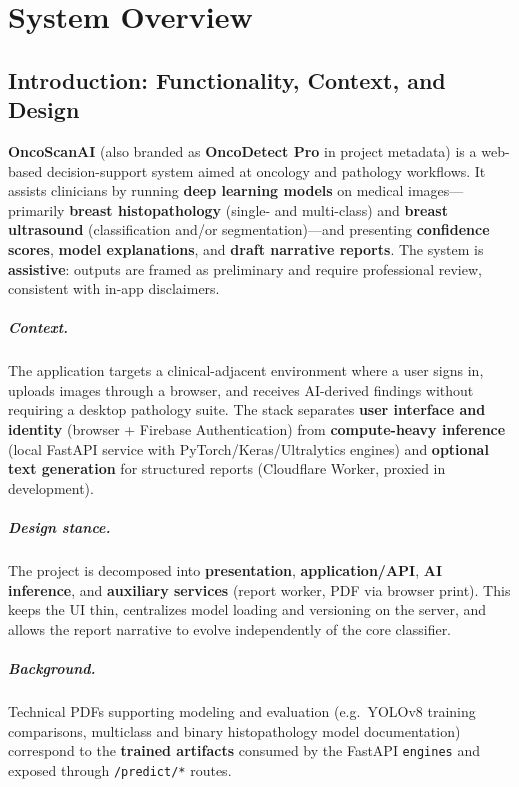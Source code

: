 \documentclass[12pt,a4paper]{report}
\begin{document}
\tableofcontents
\newpage

\chapter{System Overview}
\label{ch:system-overview}

\section{Introduction: Functionality, Context, and Design}

\textbf{OncoScanAI} (also branded as \textbf{OncoDetect Pro} in project metadata) is a web-based decision-support system aimed at oncology and pathology workflows. It assists clinicians by running \textbf{deep learning models} on medical images---primarily \textbf{breast histopathology} (single- and multi-class) and \textbf{breast ultrasound} (classification and/or segmentation)---and presenting \textbf{confidence scores}, \textbf{model explanations}, and \textbf{draft narrative reports}. The system is \textbf{assistive}: outputs are framed as preliminary and require professional review, consistent with in-app disclaimers.

\paragraph{Context.}
The application targets a clinical-adjacent environment where a user signs in, uploads images through a browser, and receives AI-derived findings without requiring a desktop pathology suite. The stack separates \textbf{user interface and identity} (browser + Firebase Authentication) from \textbf{compute-heavy inference} (local FastAPI service with PyTorch/Keras/Ultralytics engines) and \textbf{optional text generation} for structured reports (Cloudflare Worker, proxied in development).

\paragraph{Design stance.}
The project is decomposed into \textbf{presentation}, \textbf{application/API}, \textbf{AI inference}, and \textbf{auxiliary services} (report worker, PDF via browser print). This keeps the UI thin, centralizes model loading and versioning on the server, and allows the report narrative to evolve independently of the core classifier.

\paragraph{Background.}
Technical PDFs supporting modeling and evaluation (e.g.\ YOLOv8 training comparisons, multiclass and binary histopathology model documentation) correspond to the \textbf{trained artifacts} consumed by the FastAPI \texttt{engines} and exposed through \texttt{/predict/*} routes.
\end{document}
